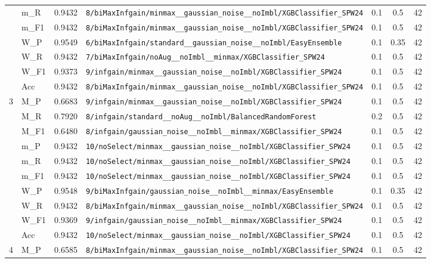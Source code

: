 \begin{table}[htbp]
\begin{tabular}{|c|l|c|>{\ttfamily\footnotesize}p{7.2cm}|c|c|c|}
 & m\_R & 0.9432 & \texttt{8/biMaxInfgain/minmax\_\_gaussian\_noise\_\_noImbl/XGBClassifier\_SPW24} & 0.1 & 0.5  & 42 \\ 
 & m\_F1 & 0.9432 & \texttt{8/biMaxInfgain/minmax\_\_gaussian\_noise\_\_noImbl/XGBClassifier\_SPW24} & 0.1 & 0.5  & 42 \\ 
 & W\_P & 0.9549 & \texttt{6/biMaxInfgain/standard\_\_gaussian\_noise\_\_noImbl/EasyEnsemble} & 0.1 & 0.35  & 42 \\ 
 & W\_R & 0.9432 & \texttt{7/biMaxInfgain/noAug\_\_noImbl\_\_minmax/XGBClassifier\_SPW24} & 0.1 & 0.5  & 42 \\ 
 & W\_F1 & 0.9373 & \texttt{9/infgain/minmax\_\_gaussian\_noise\_\_noImbl/XGBClassifier\_SPW24} & 0.1 & 0.5  & 42 \\ 
 & Acc & 0.9432 & \texttt{8/biMaxInfgain/minmax\_\_gaussian\_noise\_\_noImbl/XGBClassifier\_SPW24} & 0.1 & 0.5  & 42 \\ 
\hline
\multirow{10}{*}{3} & M\_P & 0.6683 & \texttt{9/infgain/minmax\_\_gaussian\_noise\_\_noImbl/XGBClassifier\_SPW24} & 0.1 & 0.5  & 42 \\ 
 & M\_R & 0.7920 & \texttt{8/infgain/standard\_\_noAug\_\_noImbl/BalancedRandomForest} & 0.2 & 0.5  & 42 \\ 
 & M\_F1 & 0.6480 & \texttt{8/infgain/gaussian\_noise\_\_noImbl\_\_minmax/XGBClassifier\_SPW24} & 0.1 & 0.5  & 42 \\ 
 & m\_P & 0.9432 & \texttt{10/noSelect/minmax\_\_gaussian\_noise\_\_noImbl/XGBClassifier\_SPW24} & 0.1 & 0.5  & 42 \\ 
 & m\_R & 0.9432 & \texttt{10/noSelect/minmax\_\_gaussian\_noise\_\_noImbl/XGBClassifier\_SPW24} & 0.1 & 0.5  & 42 \\ 
 & m\_F1 & 0.9432 & \texttt{10/noSelect/minmax\_\_gaussian\_noise\_\_noImbl/XGBClassifier\_SPW24} & 0.1 & 0.5  & 42 \\ 
 & W\_P & 0.9548 & \texttt{9/biMaxInfgain/gaussian\_noise\_\_noImbl\_\_minmax/EasyEnsemble} & 0.1 & 0.35  & 42 \\ 
 & W\_R & 0.9432 & \texttt{8/biMaxInfgain/minmax\_\_gaussian\_noise\_\_noImbl/XGBClassifier\_SPW24} & 0.1 & 0.5  & 42 \\ 
 & W\_F1 & 0.9369 & \texttt{9/infgain/gaussian\_noise\_\_noImbl\_\_minmax/XGBClassifier\_SPW24} & 0.1 & 0.5  & 42 \\ 
 & Acc & 0.9432 & \texttt{10/noSelect/minmax\_\_gaussian\_noise\_\_noImbl/XGBClassifier\_SPW24} & 0.1 & 0.5  & 42 \\ 
\hline
\multirow{10}{*}{4} & M\_P & 0.6585 & \texttt{8/biMaxInfgain/minmax\_\_gaussian\_noise\_\_noImbl/XGBClassifier\_SPW24} & 0.1 & 0.5  & 42 \\ 

\end{tabular}
\end{table}
